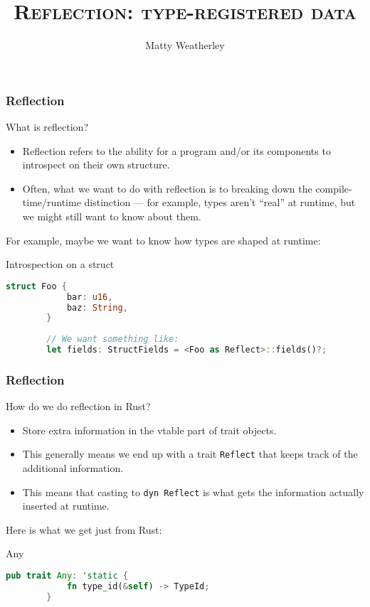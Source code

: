 \documentclass[10pt]{beamer}
\title{\textsc{Reflection: type-registered data}}
\author{Matty Weatherley}
\date{}
\begin{document}

\maketitle

\begin{frame}[fragile]
    \frametitle{Reflection}
    What is reflection?

    \begin{itemize}
        \item Reflection refers to the ability for a program and/or its components to introspect on their own structure. \pause
        \item Often, what we want to do with reflection is to breaking down the compile-time/runtime distinction --- for example, types aren't ``real'' at runtime, but we might still want to know about them. \pause
    \end{itemize}

	For example, maybe we want to know how types are shaped at runtime:
	\begin{block}{Introspection on a struct}
	\begin{lstlisting}[language=Rust, gobble=8]
        struct Foo {
            bar: u16,
            baz: String,
        }
        
        // We want something like:
        let fields: StructFields = <Foo as Reflect>::fields()?;
	\end{lstlisting}
	\end{block}
	
\end{frame}

\begin{frame}[fragile]
    \frametitle{Reflection}
    How do we do reflection in Rust?

    \begin{itemize}
        \item Store extra information in the vtable part of trait objects. \pause
        \item This generally means we end up with a trait \texttt{Reflect} that keeps track of the additional information. \pause
        \item This means that casting to \texttt{dyn Reflect} is what gets the information actually inserted at runtime. \pause
    \end{itemize}
	
	Here is what we get just from Rust:
	
	\begin{block}{Any}
	\begin{lstlisting}[language=Rust, gobble=8]
        pub trait Any: 'static {
            fn type_id(&self) -> TypeId;
        }
	\end{lstlisting}
	\end{block}
\end{frame}
\end{document}
